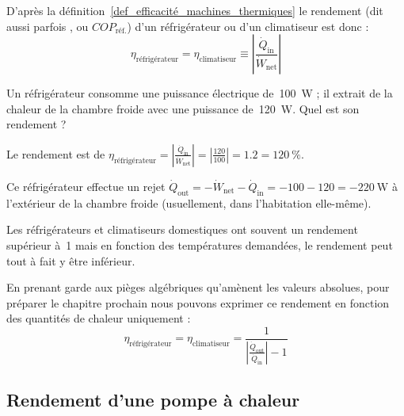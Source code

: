 			D’après la définition~\ref{def_efficacité_machines_thermiques} le rendement (dit aussi parfois , ou $COP_\text{réf.}$) d’un réfrigérateur ou d’un climatiseur est donc :
			\begin{equation}
				\eta_\text{réfrigérateur} = \eta _\text{climatiseur} \equiv  \left| \frac{\dot{Q}_\text{in}}{\dot{W}_\text{net}} \right|
			\end{equation}

			\begin{anexample}
			Un réfrigérateur consomme une puissance électrique de~\SI{100}{\watt} ; il extrait de la chaleur de la chambre froide avec une puissance de~\SI{120}{\watt}. Quel est son rendement ?
			
			\begin{answer}
				Le rendement est de $\eta_\text{réfrigérateur} = \left| \frac{\dot{Q}_\text{in}}{\dot{W}_\text{net}} \right| = \left| \frac{\num{+120}}{\num{+100}} \right| = \num{1,2} = \SI{120}{\percent}$. 
					\begin{remark} Ce réfrigérateur effectue un rejet $\dot{Q}_\text{out} = -\dot{W}_\text{net} - \dot{Q}_\text{in} = \num{-100} - \num{120}= \SI{-220}{\watt}$ à l’extérieur de la chambre froide (usuellement, dans l’habitation elle-même).\end{remark}
					\begin{remark} Les réfrigérateurs et climatiseurs domestiques ont souvent un rendement supérieur à~\num{1} mais en fonction des températures demandées, le rendement peut tout à fait y être inférieur.\end{remark}
			\end{answer}
		\end{anexample}

			En prenant garde aux pièges algébriques qu’amènent les valeurs absolues, pour préparer le chapitre prochain nous pouvons exprimer ce rendement en fonction des quantités de chaleur uniquement :
			\begin{equation}
				\eta _\text{réfrigérateur} = \eta _\text{climatiseur} = \frac{1}{\left| \frac{\dot{Q}_\text{out}}{\dot{Q}_\text{in}} \right| - 1}
				\label{rendement_réfrigérateur_qin_qout}
			\end{equation}





	\subsection{Rendement d’une pompe à chaleur}
	\label{ch_rendement_thermopompe}

